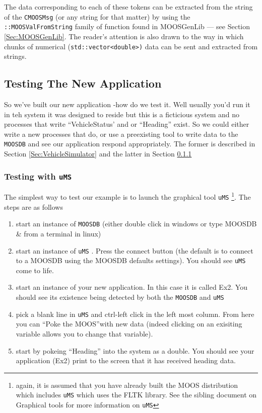 \documentclass[a4paper,10pt]{article}
\newcommand{\Code}[1]{\texttt{#1} }
\newcommand{\code}[1]{\Code{#1} }
\begin{document}
The data corresponding to each of these tokens can be extracted
from the string of the \code{CMOOSMsg} (or any string for that
matter) by using the \code{::MOOSValFromString} family of function
found in MOOSGenLib --- see Section \ref{Sec:MOOSGenLib}. The
reader's attention is also drawn to the way in which chunks of
numerical (\code{std::vector<double>)} data can be sent and
extracted from strings.

\subsection{Testing The New Application}

So we've built our new application -how do we test it. Well usually you'd run it in teh system it was designed to reside but this is a ficticious system and no processes that write ``VehicleStatus' and or ``Heading'' exist. So we could either write a new processes that do, or  use a preexisting tool to write data to the \code{MOOSDB} and see our application respond appropriately. The former is described in Section \ref{Sec:VehicleSimulator} and the latter in Section \ref{Sec:UsinguMS}

\subsubsection{Testing with \code{uMS}} \label{Sec:UsinguMS}

The simplest way to test our example is to launch the graphical tool \code{uMS} \footnote{again, it is assumed that you have already built the MOOS distribution which includes \code{uMS} which uses the FLTK library. See the sibling document on Graphical tools for more information on \code{uMS}}. The steps are as follows

\begin{enumerate}
\item start an instance of \code{MOOSDB} (either double click in windows or type MOOSDB \&  from a terminal in linux)
\item start an instance of \code{uMS}. Press the connect button (the default is to connect to a MOOSDB using the MOOSDB defaults settings). You should see \code{uMS} come to life.
\item start an instance of your new application. In this case it is called Ex2. You should see its existence being detected by both the \code{MOOSDB} and \code{uMS}
\item pick a blank line in \code{uMS} and ctrl-left click in the left most column. From here you can ``Poke the MOOS''with new data (indeed clicking on an exisiting variable allows you to change that variable).
\item start by pokeing ``Heading'' into the system as a double. You should see your application (Ex2) print to the screen that it has received heading data.
\end{enumerate}
\end{document}
